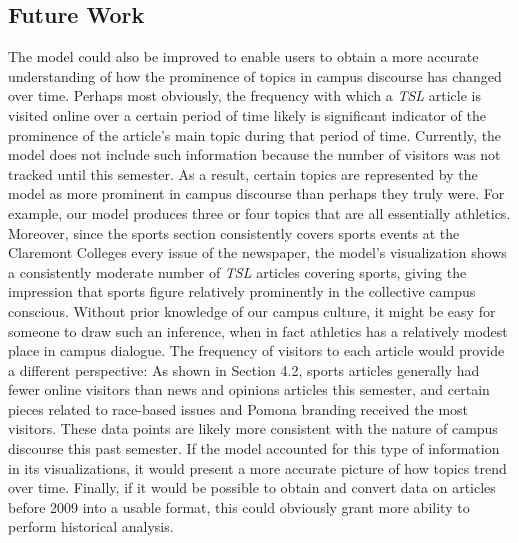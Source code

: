 \documentclass[a4paper]{article}
\begin{document}
\subsection{Future Work}
The model could also be improved to enable users to obtain a more accurate understanding of how the prominence of topics in campus discourse has changed over time. Perhaps most obviously, the frequency with which a \textit{TSL} article is visited online over a certain period of time likely is significant indicator of the prominence of the article's main topic during that period of time. Currently, the model does not include such information because the number of visitors was not tracked until this semester. As a result, certain topics are represented by the model as more prominent in campus discourse than perhaps they truly were. For example, our model produces three or four topics that are all essentially athletics. Moreover, since the sports section consistently covers sports events at the Claremont Colleges every issue of the newspaper, the model's visualization shows a consistently moderate number of \textit{TSL} articles covering sports, giving the impression that sports figure relatively prominently in the collective campus conscious. Without prior knowledge of our campus culture, it might be easy for someone to draw such an inference, when in fact athletics has a relatively modest place in campus dialogue. The frequency of visitors to each article would provide a different perspective: As shown in Section 4.2, sports articles generally had fewer online visitors than news and opinions articles this semester, and certain pieces related to race-based issues and Pomona branding received the most visitors. These data points are likely more consistent with the nature of campus discourse this past semester. If the model accounted for this type of information in its visualizations, it would present a more accurate picture of how topics trend over time. Finally, if it would be possible to obtain and convert data on articles before 2009 into a usable format, this could obviously grant more ability to perform historical analysis.
\end{document}
